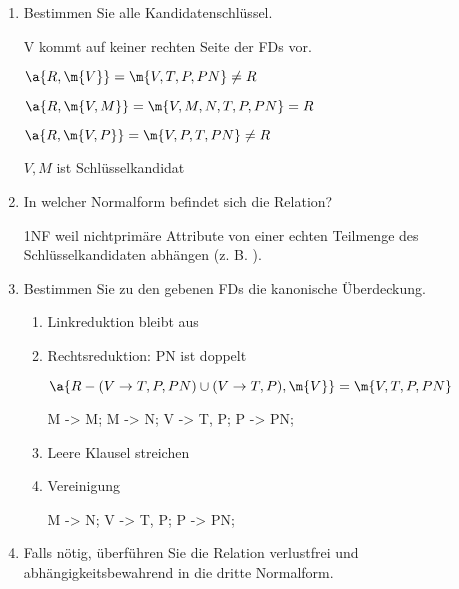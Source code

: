 \documentclass{lehramt-informatik-aufgabe}
\begin{document}
\begin{enumerate}
\item Bestimmen Sie alle Kandidatenschlüssel.

\begin{liAntwort}
V kommt auf keiner rechten Seite der FDs vor.

$\a{R, \m{V}} = \m{V, T, P, PN} \neq  R$

$\a{R, \m{V, M}} = \m{V, M, N, T, P, PN} = R$

$\a{R, \m{V, P}} = \m{V, P, T, PN} \neq R$

$V, M$ ist Schlüsselkandidat
\end{liAntwort}

\item In welcher Normalform befindet sich die Relation?

\begin{liAntwort}
1NF weil nichtprimäre Attribute von einer echten Teilmenge des
Schlüsselkandidaten abhängen (z. B. ).
\end{liAntwort}

\item Bestimmen Sie zu den gebenen FDs die kanonische Überdeckung.

\begin{liAntwort}

\begin{enumerate}
\item Linkreduktion bleibt aus

\item Rechtsreduktion: PN ist doppelt

$\a{R - (V \rightarrow T, P, PN) \cup (V \rightarrow T, P), \m{V}} = \m{V, T, P, PN}$

\begin{liFunktionaleAbhaengigkeiten}
M -> M;
M -> N;
V -> T, P;
P -> PN;
\end{liFunktionaleAbhaengigkeiten}
\item Leere Klausel streichen

\item Vereinigung

\begin{liFunktionaleAbhaengigkeiten}
M -> N;
V -> T, P;
P -> PN;
\end{liFunktionaleAbhaengigkeiten}
\end{enumerate}
\end{liAntwort}

\item Falls nötig, überführen Sie die Relation verlustfrei und
abhängigkeitsbewahrend in die dritte Normalform.
\end{enumerate}
\end{document}
